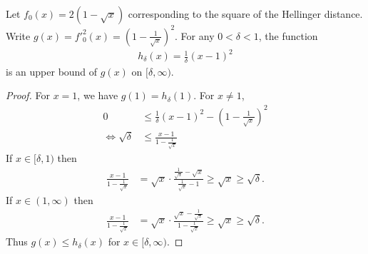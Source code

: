 \begin{lemma}\label{lemma:upper-bound-hellinger}
Let $f_0(x) = 2(1 -\sqrt{x})$ corresponding to the square of the Hellinger distance. 
Write $g(x) = f'^2_0(x) = (1-\frac{1}{\sqrt{x}})^2$.
For any $0<\delta<1$, the function
\begin{align*}
    h_\delta(x) = \frac{1}{\delta}(x-1)^2 
\end{align*}
is an upper bound of $g(x)$ on $[\delta, \infty)$.
\end{lemma}
\begin{proof}
For $x=1$, we have $g(1)=h_\delta(1)$. 
For $x\not=1$,
\begin{align*}
    0 &\leq \frac{1}{\delta}(x-1)^2 - (1-\frac{1}{\sqrt{x}})^2 \\
    \iff \sqrt{\delta} &\leq \frac{x-1}{1-\frac{1}{\sqrt{x}}}
\end{align*}
If $x \in [\delta, 1)$ then
\begin{align*}
    \frac{x-1}{1-\frac{1}{\sqrt{x}}} &= \sqrt{x} \cdot \frac{\frac{1}{\sqrt{x}} - \sqrt{x}}{\frac{1}{\sqrt{x}}-1} \geq \sqrt{x} \geq \sqrt{\delta}.
\end{align*}
If $x \in (1, \infty)$ then
\begin{align*}
    \frac{x-1}{1-\frac{1}{\sqrt{x}}} &= \sqrt{x} \cdot \frac{\sqrt{x} - \frac{1}{\sqrt{x}}}{1-\frac{1}{\sqrt{x}}} \geq \sqrt{x} \geq \sqrt{\delta}.
\end{align*}
Thus $g(x) \leq h_\delta(x)$ for $x\in[\delta, \infty)$.
\end{proof}

